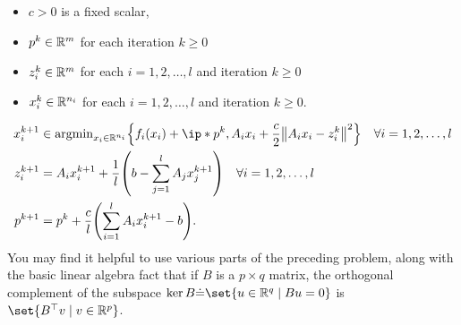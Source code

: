 \documentclass{article}
\begin{document}
\begin{problem}
\begin{enumerate}[(a)]
        \begin{itemize}
            \item $c>0$ is a fixed scalar,
            \item $p^k\in\mathbb{R}^m$ for each iteration $k\geq 0$
            \item $z_i^k\in\mathbb{R}^m$ for each $i=1,2,\ldots,l$ and iteration $k\geq 0$
            \item $x_i^k\in\mathbb{R}^{n_i}$ for each $i=1,2,\ldots,l$ and iteration $k\geq 0$.
        \end{itemize}
        \begin{align*}
            x_i^{k+1} &\in \argmin_{x_i\in\R^{n_i}}\braces*{f_i(x_i)+\ip*{p^k,A_ix_i}+\frac{c}{2}\norm*{A_ix_i-z_i^k}^2} \quad \forall i=1,2,\ldots,l\\
            z_i^{k+1} &= A_ix_i^{k+1}+\frac{1}{l}\parens*{b-\sum_{j=1}^lA_jx_j^{k+1}} \quad \forall i=1,2,\ldots,l \\
            p^{k+1} &= p^k+\frac{c}{l}\parens*{\sum_{i=1}^lA_ix_i^{k+1}-b}.
        \end{align*}
        You may find it helpful to use various parts of the preceding problem, along with the basic linear algebra fact that if $B$ is a $p\times q$ matrix, the orthogonal complement of the subspace $\ker B \dot{=}\set{u\in\R^q\mid Bu=0}$ is $\set{B^{\top}v\mid v\in\R^p}$.
    \end{enumerate}
\end{problem}
\end{document}
